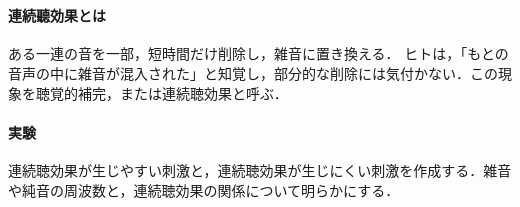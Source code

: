 \section{\kadaidb}\label{sec:\kadaidb}
\purpose
\paragraph{連続聽効果とは}
ある一連の音を一部，短時間だけ削除し，雑音に置き換える．
ヒトは，「もとの音声の中に雑音が混入された」と知覚し，部分的な削除には気付かない．この現象を聴覚的補完，または連続聴効果と呼ぶ．\cite[p.182\ -\ p.183]{感覚知覚心理学}
\paragraph{実験}
連続聴効果が生じやすい刺激と，連続聴効果が生じにくい刺激を作成する．雑音や純音の周波数と，連続聴効果の関係について明らかにする．
\method
